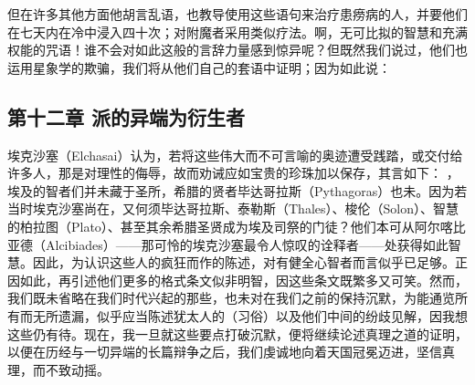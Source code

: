 但在许多其他方面他胡言乱语，也教导使用这些语句来治疗患痨病的人，并要他们在七天内在冷中浸入四十次；对附魔者采用类似疗法。啊，无可比拟的智慧和充满权能的咒语！谁不会对如此这般的言辞力量感到惊异呢？但既然我们说过，他们也运用星象学的欺骗，我们将从他们自己的套语中证明；因为如此说：\par


\subsection{第十二章 派的异端为衍生者}

埃克沙塞（Elchasai）认为，若将这些伟大而不可言喻的奥迹遭受践踏，或交付给许多人，那是对理性的侮辱，故而劝诫应如宝贵的珍珠加以保存，其言如下： ，埃及的智者们并未藏于圣所，希腊的贤者毕达哥拉斯（Pythagoras）也未。因为若当时埃克沙塞尚在，又何须毕达哥拉斯、泰勒斯（Thales）、梭伦（Solon）、智慧的柏拉图（Plato）、甚至其余希腊圣贤成为埃及司祭的门徒？他们本可从阿尔喀比亚德（Alcibiades）——那可怜的埃克沙塞最令人惊叹的诠释者——处获得如此智慧。因此，为认识这些人的疯狂而作的陈述，对有健全心智者而言似乎已足够。正因如此，再引述他们更多的格式条文似非明智，因这些条文既繁多又可笑。然而，我们既未省略在我们时代兴起的那些，也未对在我们之前的保持沉默，为能通览所有而无所遗漏，似乎应当陈述犹太人的（习俗）以及他们中间的纷歧见解，因我想这些仍有待。现在，我一旦就这些要点打破沉默，便将继续论述真理之道的证明，以便在历经与一切异端的长篇辩争之后，我们虔诚地向着天国冠冕迈进，坚信真理，而不致动摇。\par


